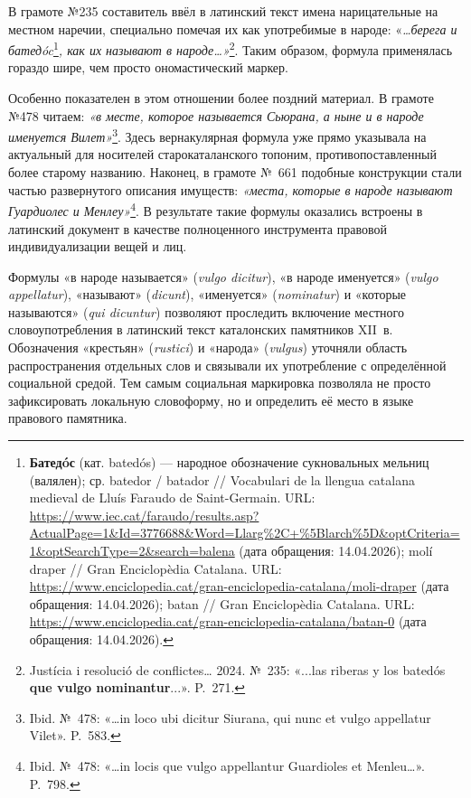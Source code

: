 В грамоте №235 составитель ввёл в латинский текст имена нарицательные на местном наречии, специально помечая их как употребимые в народе: «\emph{…берега и батедó}\emph{c}\footnote{\textbf{Батед}\textbf{ó}\textbf{с} (кат. batedós) --- народное обозначение сукновальных мельниц (валялен); ср. batedor / batador // Vocabulari de la llengua catalana medieval de Lluís Faraudo de Saint-Germain. URL: \url{https://www.iec.cat/faraudo/results.asp?ActualPage=1&Id=3776688&Word=Llarg\%2C+\%5Blarch\%5D&optCriteria=1&optSearchType=2&search=balena} (дата обращения: 14.04.2026); molí draper // Gran Enciclopèdia Catalana. URL: \url{https://www.enciclopedia.cat/gran-enciclopedia-catalana/moli-draper} (дата обращения: 14.04.2026); batan // Gran Enciclopèdia Catalana. URL: \url{https://www.enciclopedia.cat/gran-enciclopedia-catalana/batan-0} (дата обращения: 14.04.2026).}\emph{, как их называют в народе…»}\footnote{Justícia i resolució de conflictes… 2024. №~235: «...las riberas y los batedós \textbf{que vulgo nominantur}...». P.~271.}. Таким образом, формула применялась гораздо шире, чем просто ономастический маркер.

Особенно показателен в этом отношении более поздний материал. В грамоте №478 читаем: \emph{«в месте, которое называется Сьюрана, а ныне и в народе именуется Вилет»}\footnote{Ibid. №~478: «…in loco ubi dicitur Siurana, qui nunc et vulgo appellatur Vilet». P.~583.}. Здесь вернакулярная формула уже прямо указывала на актуальный для носителей старокаталанского топоним, противопоставленный более старому названию. Наконец, в грамоте №~661 подобные конструкции стали частью развернутого описания имуществ: \emph{«места, которые в народе называют Гуардиолес и Менлеу»}\footnote{Ibid. №~478: «…in locis que vulgo appellantur Guardioles et Menleu…». P.~798.}. В результате такие формулы оказались встроены в латинский документ в качестве полноценного инструмента правовой индивидуализации вещей и лиц.

Формулы «в народе называется» (\emph{vulgo dicitur}), «в народе именуется» (\emph{vulgo appellatur}), «называют» (\emph{dicunt}), «именуется» (\emph{nominatur}) и «которые называются» (\emph{qui dicuntur}) позволяют проследить включение местного словоупотребления в латинский текст каталонских памятников XII~в. Обозначения «крестьян» (\emph{rustici}) и «народа» (\emph{vulgus}) уточняли область распространения отдельных слов и связывали их употребление с определённой социальной средой. Тем самым социальная маркировка позволяла не просто зафиксировать локальную словоформу, но и определить её место в языке правового памятника.

